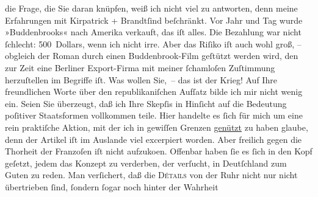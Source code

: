 \begin{ledgroupsized}[t]{13cm}
               die Frage, die Sie daran knüpfen, weiß ich nicht viel zu antworten, denn meine
               Erfahrungen mit Kirpatrick + Brandtſind beſchränkt. Vor Jahr und Tag wurde »Buddenbrooks« nach Amerika verkauft, das iſt alles. Die Bezahlung war nicht ſchlecht:
               500 Dollars, wenn ich nicht irre. Aber das Riſiko iſt auch wohl groß, – obgleich der
               Roman durch einen Buddenbrook-Film geſtützt
               werden wird, den zur Zeit eine Berliner
               Export-Firma mit meiner ſchamloſen Zuſtimmung {\pb}herzuſtellen im Begriffe iſt. Was wollen
               Sie, – das ist der Krieg!\pend
           \pstart
           Auf Ihre freundlichen Worte über den republikaniſchen Aufſatz bilde ich mir nicht wenig ein. Seien Sie überzeugt,
               daß ich Ihre Skepſis in Hinſicht auf die Bedeutung poſitiver Staatsformen vollkommen
               teile. Hier handelte es ſich für mich um eine rein praktiſche Aktion, mit der ich in
               gewiſſen Grenzen \uline{genützt} zu haben glaube, denn der
                  Artikel iſt im Auslande
               viel excerpiert worden. Aber freilich gegen die Thorheit der Franzoſen iſt nicht aufzuko{\geminationm}en.
               Offenbar haben ſie es ſich in den Kopf geſetzt, jedem das Konzept zu verderben, der
               verſucht, in Deutſchland zum Guten zu reden. Man
               verſichert, daß die \textsc{Détails} von der Ruhr nicht nur nicht übertrieben ſind, ſon{\pb}dern ſogar noch hinter der Wahrheit

\end{ledgroupsized}

